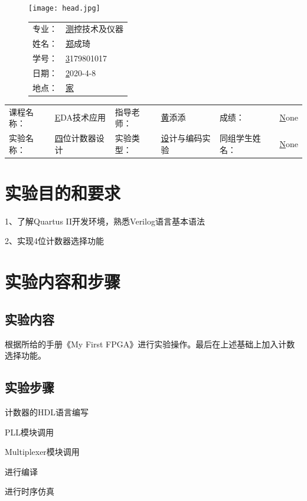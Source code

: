 \documentclass{zjureport}
\newcommand{\major}{测控技术及仪器}
\newcommand{\name}{郑成琦}
\newcommand{\stuid}{3179801017}
\newcommand{\newdate}{2020-4-8}
\newcommand{\loc}{家}
\newcommand{\course}{EDA技术应用}
\newcommand{\tutor}{黄添添}
\newcommand{\grades}{None}
\newcommand{\newtitle}{四位计数器设计}
\newcommand{\exptype}{设计与编码实验}
\newcommand{\group}{None}
\begin{document}
\thispagestyle{empty}
\begin{figure}[h]
  \begin{minipage}{0.6\linewidth}
    \centerline{\texttt{[image: head.jpg]}}
  \end{minipage}
  \hfill
  \begin{minipage}{.4\linewidth}
    \raggedleft
    \begin{tabular*}{.8\linewidth}{ll}
      专业： & \underline\major   \\
      姓名： & \underline\name    \\
      学号： & \underline\stuid   \\
      日期： & \underline\newdate \\
      地点： & \underline\loc
    \end{tabular*}
  \end{minipage}
\end{figure}

\begin{table}[!htbp]
  \centering
  \begin{tabular*}{\linewidth}{llllll}
    课程名称： & \underline\course   & 指导老师： & \underline\tutor   & 成绩：       &  \underline\grades \\
    实验名称： & \underline\newtitle & 实验类型： & \underline\exptype & 同组学生姓名：& \underline\group
  \end{tabular*}
\end{table}


\section{实验目的和要求}
1、了解Quartus II开发环境，熟悉Verilog语言基本语法

2、实现4位计数器选择功能
\section{实验内容和步骤}

  \subsection{实验内容}
	根据所给的手册《My First FPGA》进行实验操作。最后在上述基础上加入计数选择功能。
  \subsection{实验步骤}
	\begin{clause}
		\item 计数器的HDL语言编写
		\item PLL模块调用
		\item Multiplexer模块调用
		\item 进行编译
		\item 进行时序仿真
	\end{clause}
\end{document}
